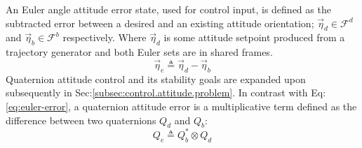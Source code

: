 An Euler angle attitude error state, used for control input, is defined as the subtracted error between a desired and an existing attitude orientation; $\vec{\eta}_d\in\mathcal{F}^d$ and $\vec{\eta}_b\in\mathcal{F}^b$ respectively. Where $\vec{\eta}_d$ is some attitude setpoint produced from a trajectory generator and both Euler sets are in shared frames.
\begin{equation}\label{eq:euler-error}
\vec{\eta}_e\triangleq\vec{\eta}_d-\vec{\eta}_b
\end{equation}
Quaternion attitude control and its stability goals are expanded upon subsequently in Sec:\ref{subsec:control.attitude.problem}. In contrast with Eq:\ref{eq:euler-error}, a quaternion attitude error is a multiplicative term defined as the difference between two quaternions $Q_d$ and $Q_b$:
\begin{equation}\label{eq:quaternion-error}
Q_e\triangleq Q_b^*\otimes Q_d
\end{equation}
